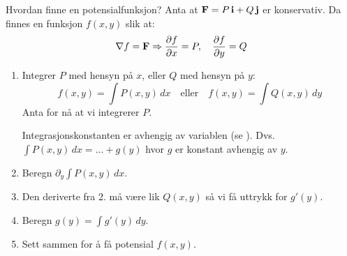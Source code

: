 \begin{oppsum}{Hvordan finne en potensialfunksjon?}
Anta at \( \mathbf{F} = P\, \mathbf{i} + Q\, \mathbf{j} \) er konservativ. Da finnes en funksjon \( f(x, y) \) slik at:
\[
\nabla f = \mathbf{F} \Rightarrow \frac{\partial f}{\partial x} = P,\quad \frac{\partial f}{\partial y} = Q
\]
\begin{enumerate}
\item[1.] Integrer \( P \) med hensyn på \( x \), eller \( Q \) med hensyn på \( y \):
\[
f(x, y) = \int P(x, y)\, dx \quad \text{eller} \quad f(x, y) = \int Q(x, y)\, dy
\]
Anta for nå at vi integrerer $P$. 

\begin{minipage}{.9\columnwidth}
\begin{rem}{}
     Integrasjonskonstanten er  avhengig av variablen (se ). Dvs. $\int P(x, y)\, dx = \ldots + g(y)$ hvor $g$ er konstant avhengig av $y$.
\end{rem}
\end{minipage}
\item[2.] Beregn $\partial_y \int P(x, y)\, dx$.
\item[3.] Den deriverte fra 2. må være lik $Q(x,y)$ så vi få uttrykk for $g'(y)$. 
\item[4.] Beregn $g(y)= \int g'(y)\, dy$.
\item[5.] Sett sammen for å få potensial $f(x,y)$.
\end{enumerate}
\end{oppsum}

